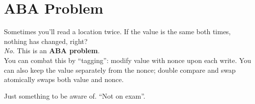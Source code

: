 \documentclass[11pt]{article}
\begin{document}
\section*{ABA Problem}
Sometimes you'll read a location twice.
If the value is the same both times, nothing has changed, right?\\[1em]

\emph{No.} This is an {\bf ABA problem}.\\[1em]

You can combat this by ``tagging'': modify value with nonce upon each
write.  You can also keep the value separately from the nonce; double
compare and swap atomically swaps both value and nonce.

Just something to be aware of. ``Not on exam''.
\end{document}
